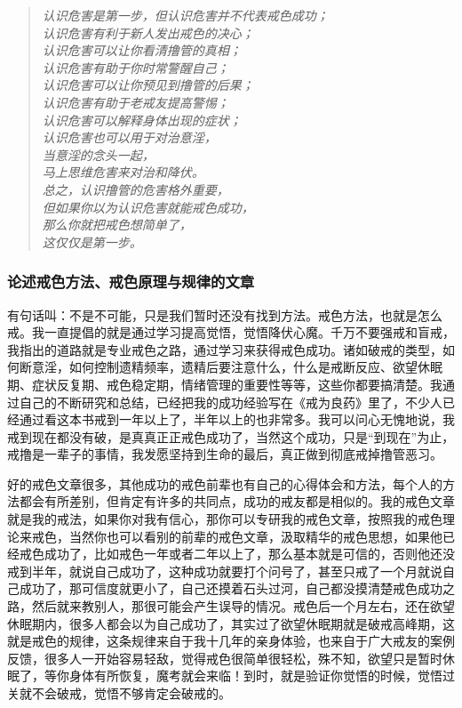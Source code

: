 \documentclass{ctexart}
\begin{document}
\begin{quotation}\it
    认识危害是第一步，但认识危害并不代表戒色成功； \\ 认识危害有利于新人发出戒色的决心； \\ 认识危害可以让你看清撸管的真相； \\ 认识危害有助于你时常警醒自己； \\ 认识危害可以让你预见到撸管的后果； \\ 认识危害有助于老戒友提高警惕； \\ 认识危害可以解释身体出现的症状； \\ 认识危害也可以用于对治意淫， \\ 当意淫的念头一起， \\ 马上思维危害来对治和降伏。 \\ 总之，认识撸管的危害格外重要， \\ 但如果你以为认识危害就能戒色成功， \\ 那么你就把戒色想简单了， \\ 这仅仅是第一步。
\end{quotation}

\subsubsection{论述戒色方法、戒色原理与规律的文章}

有句话叫：不是不可能，只是我们暂时还没有找到方法。戒色方法，也就是怎么戒。我一直提倡的就是通过学习提高觉悟，觉悟降伏心魔。千万不要强戒和盲戒，我指出的道路就是专业戒色之路，通过学习来获得戒色成功。诸如破戒的类型，如何断意淫，如何控制遗精频率，遗精后要注意什么，什么是戒断反应、欲望休眠期、症状反复期、戒色稳定期，情绪管理的重要性等等，这些你都要搞清楚。我通过自己的不断研究和总结，已经把我的成功经验写在《戒为良药》里了，不少人已经通过看这本书戒到一年以上了，半年以上的也非常多。我可以问心无愧地说，我戒到现在都没有破，是真真正正戒色成功了，当然这个成功，只是“到现在”为止，戒撸是一辈子的事情，我发愿坚持到生命的最后，真正做到彻底戒掉撸管恶习。

好的戒色文章很多，其他成功的戒色前辈也有自己的心得体会和方法，每个人的方法都会有所差别，但肯定有许多的共同点，成功的戒友都是相似的。我的戒色文章就是我的戒法，如果你对我有信心，那你可以专研我的戒色文章，按照我的戒色理论来戒色，当然你也可以看别的前辈的戒色文章，汲取精华的戒色思想，如果他已经戒色成功了，比如戒色一年或者二年以上了，那么基本就是可信的，否则他还没戒到半年，就说自己成功了，这种成功就要打个问号了，甚至只戒了一个月就说自己成功了，那可信度就更小了，自己还摸着石头过河，自己都没摸清楚戒色成功之路，然后就来教别人，那很可能会产生误导的情况。戒色后一个月左右，还在欲望休眠期内，很多人都会以为自己成功了，其实过了欲望休眠期就是破戒高峰期，这就是戒色的规律，这条规律来自于我十几年的亲身体验，也来自于广大戒友的案例反馈，很多人一开始容易轻敌，觉得戒色很简单很轻松，殊不知，欲望只是暂时休眠了，等你身体有所恢复，魔考就会来临！到时，就是验证你觉悟的时候，觉悟过关就不会破戒，觉悟不够肯定会破戒的。
\end{document}
